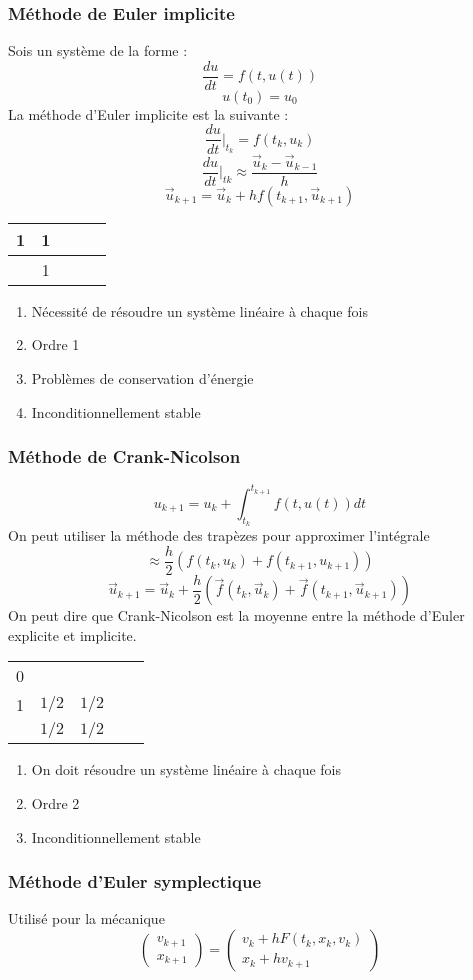 \documentclass[resume]{subfiles}
\begin{document}
\subsubsection{Méthode de Euler implicite}
Sois un système de la forme :
$$\frac{du}{dt}=f(t,u(t))$$
$$u(t_0)=u_0$$
La méthode d'Euler implicite est la suivante :
$$\frac{du}{dt}\Big|_{t_k}=f(t_k,u_k)$$
$$\frac{du}{dt}\Big|_{tk}\approx \frac{\vec{u}_k-\vec{u}_{k-1}}{h}$$
$$\boxed{\vec{u}_{k+1}=\vec{u}_{k}+hf(t_{k+1},\vec{u}_{k+1})}$$
\begin{table}[H]
\centering
\renewcommand{\arraystretch}{1.5}
\begin{tabular}{c|cccc}
1 & 1\\\hline
 & 1
\end{tabular}
\end{table}
\begin{enumerate}
\item Nécessité de résoudre un système linéaire à chaque fois
\item Ordre 1
\item Problèmes de conservation d'énergie
\item Inconditionnellement stable	
\end{enumerate}
\subsubsection{Méthode de Crank-Nicolson}
$$u_{k+1}=u_k+\int_{t_k}^{t_{k+1}}f(t,u(t))dt$$
On peut utiliser la méthode des trapèzes pour approximer l'intégrale
$$\approx \frac{h}{2}\left(f(t_k,u_k)+f(t_{k+1},u_{k+1})\right)$$
$$\boxed{\vec{u}_{k+1}=\vec{u}_k+\frac{h}{2}\left(\vec{f}(t_k,\vec{u}_k)+\vec{f}(t_{k+1},\vec{u}_{k+1})\right)}$$
On peut dire que Crank-Nicolson est la moyenne entre la méthode d'Euler explicite et implicite.
\begin{table}[H]
\centering
\renewcommand{\arraystretch}{1.5}
\begin{tabular}{c|cccc}
0 & \\
1 & $1/2$ & $1/2$\\\hline
 & $1/2$ & $1/2$
\end{tabular}
\end{table}
\begin{enumerate}
\item On doit résoudre un système linéaire à chaque fois
\item Ordre 2
\item Inconditionnellement stable
\end{enumerate}
\subsubsection{Méthode d'Euler symplectique}
Utilisé pour la mécanique
$$\boxed{\begin{pmatrix}
v_{k+1}\\x_{k+1}
\end{pmatrix}=\begin{pmatrix}
v_k+hF(t_k,x_k,v_k)\\
x_k+hv_{k+1}
\end{pmatrix}}$$
\end{document}
